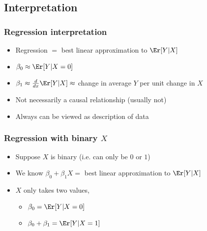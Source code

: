 \subsection{Interpretation}
\begin{frame} \frametitle{Regression interpretation}
  \begin{itemize}
  \item Regression $=$ best linear approximation to $\Er[Y|X]$
  \item $\beta_0 \approx \Er[Y|X=0]$
  \item $\beta_1 \approx \frac{d}{dx} \Er[Y|X] \approx$ change in average
    $Y$ per unit change in $X$
  \item Not necessarily a causal relationship (usually not)
  \item Always can be viewed as description of data
  \end{itemize}
\end{frame}

\begin{frame}\frametitle{Regression with binary $X$}
  
      \begin{itemize}
      \item Suppose $X$ is binary (i.e. can only be $0$ or $1$)
      \item We know $\beta_0 + \beta_1 X = $ best linear approximation to
        $\Er[Y|X]$ 
      \item $X$ only takes two values,

        \begin{itemize}
        \item $\beta_0 = \Er[Y|X=0]$
        \item $\beta_0 + \beta_1 = \Er[Y|X=1]$
        \end{itemize}

      \end{itemize}
    
\end{frame}

